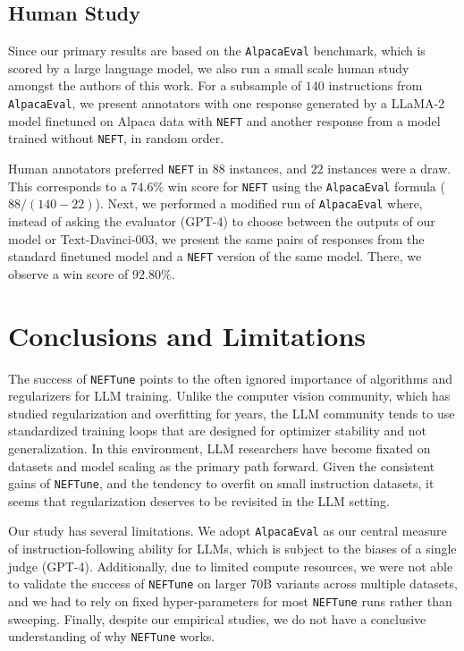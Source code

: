 \documentclass{article} %
\newcommand{\neft}{\texttt{NEFT}}
\newcommand{\neftune}{\texttt{NEFTune}}
\newcommand{\llama}{LLaMA}
\begin{document}
\subsection{Human Study} \label{sec:human_study}

Since our primary results are based on the \texttt{AlpacaEval} benchmark, which is scored by a large language model, we also run a small scale human study amongst the authors of this work. For a subsample of $140$ instructions from \texttt{AlpacaEval}, we present annotators with one response generated by a \llama{}-2 model finetuned on Alpaca data with \neft{} and another response from a model trained without \neft{}, in random order.

Human annotators preferred \neft{} in $88$ instances, and $22$ instances were a draw.  This corresponds to a $74.6\%$ win score for \neft{} using the \texttt{AlpacaEval} formula ($88/(140-22)$).
Next, we performed a modified run of \texttt{AlpacaEval} where, instead of asking the evaluator (GPT-4) to choose between the outputs of our model or Text-Davinci-003, we present the same pairs of responses from the standard finetuned model and a \neft{} version of the same model. There, we observe a win score of $92.80\%$.


\section{Conclusions and Limitations}


The success of \neftune{} points to the often ignored importance of algorithms and regularizers for LLM training.  Unlike the computer vision community, which has studied regularization and overfitting for years, the LLM community tends to use standardized training loops that are designed for optimizer stability and not generalization. In this environment, LLM researchers have become fixated on datasets and model scaling as the primary path forward.  Given the consistent gains of \neftune{}, and the tendency to overfit on small instruction datasets, it seems that regularization deserves to be revisited in the LLM setting.

Our study has several limitations. We adopt \texttt{AlpacaEval} as our central measure of instruction-following ability for LLMs, which is subject to the biases of a single judge (GPT-4). Additionally, due to limited compute resources, we were not able to validate the success of \neftune{} on larger $70$B variants across multiple datasets, and we had to rely on fixed hyper-parameters for most \neftune{} runs rather than sweeping.
Finally, despite our empirical studies, we do not have a conclusive understanding of why \neftune{} works.
\end{document}
